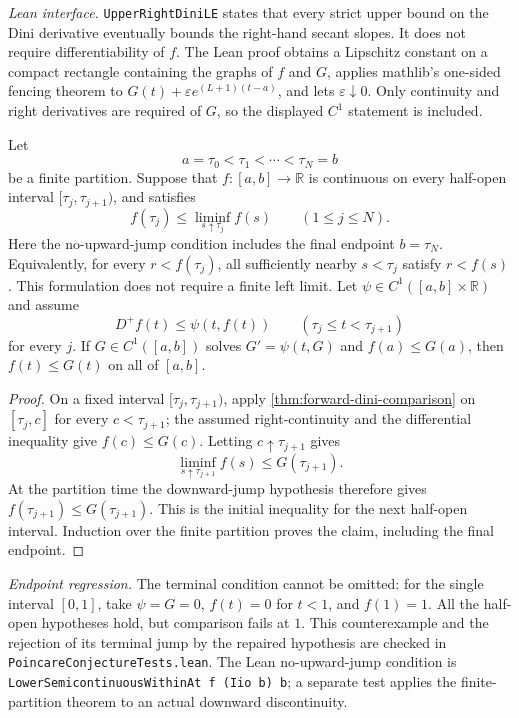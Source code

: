 \noindent\textit{Lean interface.}
\texttt{UpperRightDiniLE} states that every strict upper bound on the Dini
derivative eventually bounds the right-hand secant slopes.  It does not
require differentiability of $f$.  The Lean proof obtains a Lipschitz constant
on a compact rectangle containing the graphs of $f$ and $G$, applies mathlib's
one-sided fencing theorem to
$G(t)+\varepsilon e^{(L+1)(t-a)}$, and lets $\varepsilon\downarrow0$.
Only continuity and right derivatives are required of $G$, so the displayed
$C^1$ statement is included.

\begin{lemma}
\label{lem:forward-dini-comparison-with-downward-jumps}
\leanok
Let
\[
 a=\tau_0<\tau_1<\cdots<\tau_N=b
\]
be a finite partition.  Suppose that $f\colon[a,b]\to\mathbb R$ is
continuous on every half-open interval $[\tau_j,\tau_{j+1})$, and satisfies
\[
 f(\tau_j)\le\liminf_{s\uparrow\tau_j}f(s)\qquad(1\le j\le N).
\]
Here the no-upward-jump condition includes the final endpoint $b=\tau_N$.
Equivalently, for every $r<f(\tau_j)$, all sufficiently nearby $s<\tau_j$
satisfy $r<f(s)$.  This formulation does not require a finite left limit.
Let $\psi\in C^1([a,b]\times\mathbb R)$ and assume
\[
 D^+f(t)\le\psi(t,f(t))
 \qquad(\tau_j\le t<\tau_{j+1})
\]
for every $j$.  If $G\in C^1([a,b])$ solves
$G'=\psi(t,G)$ and $f(a)\le G(a)$, then $f(t)\le G(t)$ on all of $[a,b]$.
\end{lemma}

\begin{proof}
On a fixed interval $[\tau_j,\tau_{j+1})$, apply
\ref{thm:forward-dini-comparison} on $[\tau_j,c]$ for every
$c<\tau_{j+1}$; the assumed right-continuity and the differential inequality
give $f(c)\le G(c)$.  Letting $c\uparrow\tau_{j+1}$ gives
\[
 \liminf_{s\uparrow\tau_{j+1}}f(s)\le G(\tau_{j+1}).
\]
At the partition time the downward-jump hypothesis therefore gives
$f(\tau_{j+1})\le G(\tau_{j+1})$.  This is the initial inequality for the
next half-open interval.  Induction over the finite partition proves the
claim, including the final endpoint.
\end{proof}

\noindent\textit{Endpoint regression.}
The terminal condition cannot be omitted: for the single interval $[0,1]$,
take $\psi=G=0$, $f(t)=0$ for $t<1$, and $f(1)=1$.  All the half-open
hypotheses hold, but comparison fails at $1$.  This counterexample and the
rejection of its terminal jump by the repaired hypothesis are checked in
\texttt{PoincareConjectureTests.lean}.  The Lean no-upward-jump condition is
\texttt{LowerSemicontinuousWithinAt f (Iio b) b}; a separate test applies the
finite-partition theorem to an actual downward discontinuity.

